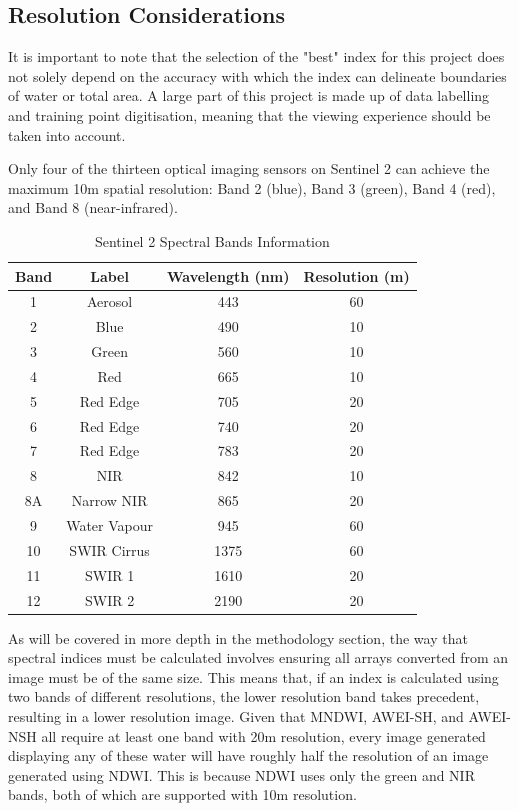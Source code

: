 \subsection{Resolution Considerations}
It is important to note that the selection of the "best" index for this project does not solely depend on the accuracy with which the index can delineate boundaries of water or total area. A large part of this project is made up of data labelling and training point digitisation, meaning that the viewing experience should be taken into account. 

Only four of the thirteen optical imaging sensors on Sentinel 2 can achieve the maximum 10m spatial resolution: Band 2 (blue), Band 3 (green), Band 4 (red), and Band 8 (near-infrared). 

\begin{table}[ht]
\centering
\begin{tabular}{|c|c|c|c|}
\hline
\textbf{Band} & \textbf{Label} & \textbf{Wavelength (nm)} & \textbf{Resolution (m)} \\
\hline
1 & Aerosol & 443 & 60 \\
\rowcolor{yellow} 2 & Blue & 490 & 10 \\
\rowcolor{yellow} 3 & Green & 560 & 10 \\
\rowcolor{yellow} 4 & Red & 665 & 10 \\
5 & Red Edge & 705 & 20 \\
6 & Red Edge & 740 & 20 \\
7 & Red Edge & 783 & 20 \\
\rowcolor{yellow} 8 & NIR & 842 & 10 \\
8A & Narrow NIR & 865 & 20 \\
9 & Water Vapour & 945 & 60 \\
10 & SWIR Cirrus & 1375 & 60 \\
11 & SWIR 1 & 1610 & 20 \\
12 & SWIR 2 & 2190 & 20 \\
\hline
\end{tabular}
\caption{Sentinel 2 Spectral Bands Information \citep{sinergise_2025}}
\label{tab:LR s2 band wavelengths and resolutions}
\end{table}

As will be covered in more depth in the methodology section, the way that spectral indices must be calculated involves ensuring all arrays converted from an image must be of the same size. This means that, if an index is calculated using two bands of different resolutions, the lower resolution band takes precedent, resulting in a lower resolution image. Given that MNDWI, AWEI-SH, and AWEI-NSH all require at least one band with 20m resolution, every image generated displaying any of these water will have roughly half the resolution of an image generated using NDWI. This is because NDWI uses only the green and NIR bands, both of which are supported with 10m resolution. 

